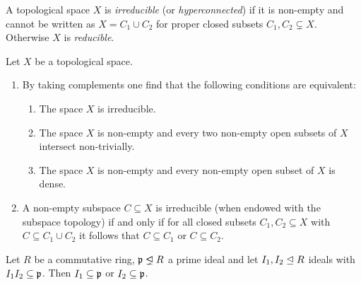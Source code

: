 \begin{definition}
  A topological space $X$ is \emph{irreducible} (or \emph{hyperconnected}) if it is non-empty and cannot be written as $X = C_1 \cup C_2$ for proper closed subsets $C_1, C_2 \subsetneq X$.
  Otherwise $X$ is \emph{reducible}.
\end{definition}


\begin{remark}
  Let $X$ be a topological space.
  \begin{enumerate}
    \item
      By taking complements one find that the following conditions are equivalent:
      \begin{enumerate}
        \item
          The space $X$ is irreducible.
        \item
          The space $X$ is non-empty and every two non-empty open subsets of $X$ intersect non-trivially.
        \item
          The space $X$ is non-empty and every non-empty open subset of $X$ is dense.
      \end{enumerate}
    \item
      A non-empty subspace $C \subseteq X$ is irreducible (when endowed with the subspace topology) if and only if for all closed subsets $C_1, C_2 \subseteq X$ with $C \subseteq C_1 \cup C_2$ it follows that $C \subseteq C_1$ or $C \subseteq C_2$.
  \end{enumerate}
\end{remark}


% 
% 




\begin{lemma}
  \label{lemma: trivial prime avoidance}
  Let $R$ be a commutative ring, $\mf{p} \idealneq R$ a prime ideal and let $I_1, I_2 \trianglelefteq R$ ideals with $I_1 I_2 \subseteq \mathfrak{p}$.
  Then $I_1 \subseteq \mathfrak{p}$ or $I_2 \subseteq \mathfrak{p}$.
\end{lemma}

